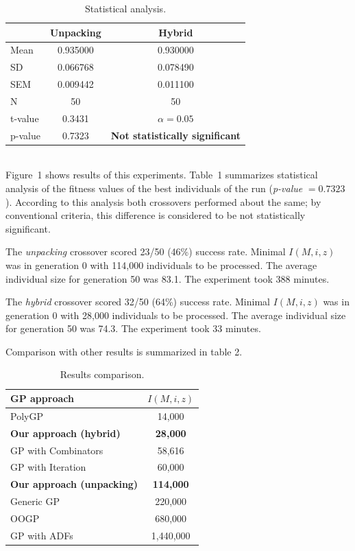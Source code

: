 \documentclass{sig-alternate}
\begin{document}
\begin{table}[t]
\centering
\begin{tabular}{|l|cc|}
\hline
& Unpacking & Hybrid \\
\hline
Mean & 0.935000	& 0.930000 \\
SD	 & 0.066768	& 0.078490 \\
SEM	 & 0.009442	& 0.011100 \\
N	 & 50    & 50    \\
\hline
t-value &  0.3431 & $\alpha = 0.05$\\
p-value &  0.7323 &  \textbf{Not statistically significant}\\
\hline
\end{tabular}
\caption{Statistical analysis.}
\end{table}~\\

Figure~1 shows results of this experiments. 
Table~1 summarizes statistical analysis
of the fitness values of the best individuals of the run 
(\textit{p-value} $ = 0.7323$).  
According to this analysis both crossovers performed about the same;
by conventional criteria, this difference is considered to be not 
statistically significant.

The \textit{unpacking} crossover scored 23/50 (46\%) success rate. 
Minimal $I(M,i,z)$ was in generation 0 with 114,000 individuals to be processed.
The average individual size for generation 50 was 83.1.
The experiment took 388 minutes.

The \textit{hybrid} crossover scored 32/50 (64\%) success rate. 
Minimal $I(M,i,z)$ was in generation 0 with 28,000 individuals to be processed.
The average individual size for generation 50 was 74.3.
The experiment took 33 minutes.

Comparison with other results is summarized in table 2.


\begin{table}[t]
\centering
\begin{tabular}{|l|c|}
\hline
GP approach &  $I(M,i,z)$ \\
\hline
PolyGP                 &  14,000       \\
\textbf{Our approach (hybrid)}&  \textbf{28,000} \\
GP with Combinators	   &  58,616        \\
GP with Iteration      &  60,000       \\
\textbf{Our approach (unpacking)}&  \textbf{114,000} \\
Generic GP	           &  220,000      \\
OOGP	               &  680,000      \\
GP with ADFs           &1,440,000      \\
\hline
\end{tabular}
\caption{Results comparison.}
\end{table}~\\
\end{document}
